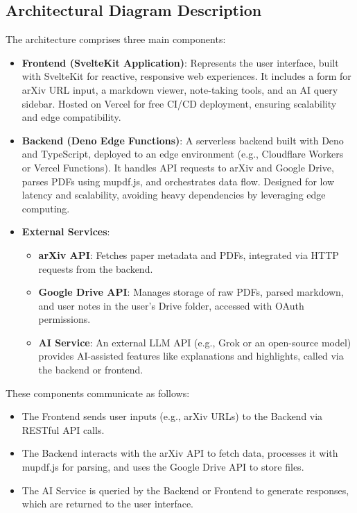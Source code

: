 \documentclass[12pt]{article}
\begin{document}
\subsection{Architectural Diagram Description}
The architecture comprises three main components:
\begin{itemize}
  \item \textbf{Frontend (SvelteKit Application)}: Represents the user interface, built with SvelteKit for reactive, responsive web experiences. It includes a form for arXiv URL input, a markdown viewer, note-taking tools, and an AI query sidebar. Hosted on Vercel for free CI/CD deployment, ensuring scalability and edge compatibility.
  \item \textbf{Backend (Deno Edge Functions)}: A serverless backend built with Deno and TypeScript, deployed to an edge environment (e.g., Cloudflare Workers or Vercel Functions). It handles API requests to arXiv and Google Drive, parses PDFs using mupdf.js, and orchestrates data flow. Designed for low latency and scalability, avoiding heavy dependencies by leveraging edge computing.
  \item \textbf{External Services}:
    \begin{itemize}
      \item \textbf{arXiv API}: Fetches paper metadata and PDFs, integrated via HTTP requests from the backend.
      \item \textbf{Google Drive API}: Manages storage of raw PDFs, parsed markdown, and user notes in the user's Drive folder, accessed with OAuth permissions.
      \item \textbf{AI Service}: An external LLM API (e.g., Grok or an open-source model) provides AI-assisted features like explanations and highlights, called via the backend or frontend.
    \end{itemize}
\end{itemize}
These components communicate as follows:
\begin{itemize}
  \item The Frontend sends user inputs (e.g., arXiv URLs) to the Backend via RESTful API calls.
  \item The Backend interacts with the arXiv API to fetch data, processes it with mupdf.js for parsing, and uses the Google Drive API to store files.
  \item The AI Service is queried by the Backend or Frontend to generate responses, which are returned to the user interface.
\end{itemize}
\end{document}
